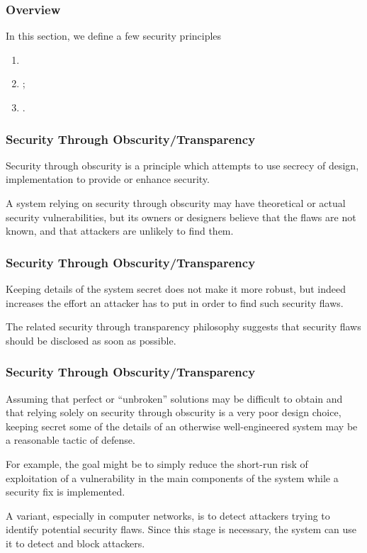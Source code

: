 
\begin{frame}
  \frametitle{Overview}

  In this section, we define a few security principles

  \begin{enumerate}
    \item
    \item
      ;
    \item
      .
  \end{enumerate}
\end{frame}


\begin{frame}
  \frametitle{Security Through Obscurity/Transparency}

  Security through obscurity is a principle which attempts to use secrecy of
  design, implementation \etc{} to provide or enhance security.

  \-

  A system relying on security through obscurity may have theoretical or
  actual security vulnerabilities, but its owners or designers believe that
  the flaws are not known, and that attackers are unlikely to find them.
\end{frame}


\begin{frame}
  \frametitle{Security Through Obscurity/Transparency}

  Keeping details of the system secret does not make it more robust, but
  indeed increases the effort an attacker has to put in order to find such
  security flaws.

  \-

  The related security through transparency philosophy suggests that security
  flaws should be disclosed as soon as possible.
\end{frame}


\begin{frame}
  \frametitle{Security Through Obscurity/Transparency}

  Assuming that perfect or ``unbroken'' solutions may be difficult to obtain
  and that relying solely on security through obscurity is a very poor design
  choice, keeping secret some of the details of an otherwise well-engineered
  system may be a reasonable tactic of defense.

  \-

  For example, the goal might be to simply reduce the short-run risk of
  exploitation of a vulnerability in the main components of the system while
  a security fix is implemented.

  \-

  A variant, especially in computer networks, is to detect attackers trying
  to identify potential security flaws. Since this stage is necessary, the
  system can use it to detect and block attackers.
\end{frame}

